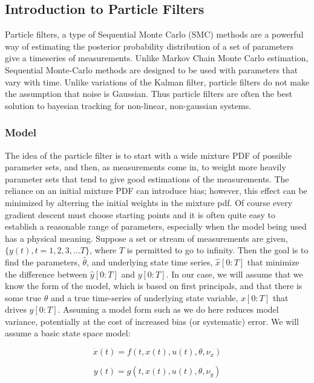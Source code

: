 \documentclass{article}
\begin{document}
\subsection{Introduction to Particle Filters}
Particle filters, a type of Sequential Monte Carlo (SMC) methods
are a powerful way of estimating the posterior probability distribution
of a set of parameters give a timeseries of measurements. Unlike Markov 
Chain Monte Carlo estimation, Sequential Monte-Carlo methods are designed
to be used with parameters that vary with time. Unlike variations of the
Kalman filter, particle filters do not make the assumption that noise
is Gaussian. Thus particle filters are often the best solution to bayesian 
tracking for non-linear, non-gaussian systems. 
\subsubsection{Model}
The idea of the particle
filter is to start with a wide mixture PDF of possible parameter sets, 
and then, as measurements come in, to weight more heavily parameter sets 
that tend to give good estimations of the measurements. The reliance on
an initial mixture PDF can introduce bias; however, this effect can be
minimized by alterring the initial weights in the mixture pdf. Of course
every gradient descent must choose starting points and it is often quite
easy to establish a reasonable range of parameters, especially when the
model being used has a physical meaning. Suppose a set or stream of measurements
are given, $\{y(t), t = 1, 2, 3, ... T\}$, where $T$ is permitted to go
 to infinity. Then the goal is to find the 
parameters, $\hat{\theta}$, and underlying state time series, $\hat{x}[0:T]$
that minimize the difference between $\hat{y}[0:T]$
and $y[0:T]$. In our case, we will assume that we know the form
of the model, which is based on first principals, and that
there is some true $\theta$ and a true time-series of underlying
state variable, $x[0:T]$ that drives $y[0:T]$. Assuming a model form 
such as we do here reduces model variance, potentially at the cost of increased
bias (or systematic) error. We will assume a basic state space model:

\begin{equation}
\dot{x}(t) = f(t, x(t), u(t), \theta, \nu_x)
\end{equation}

\begin{equation}
y(t) = g(t, x(t), u(t), \theta, \nu_y)
\end{equation}
\end{document}
